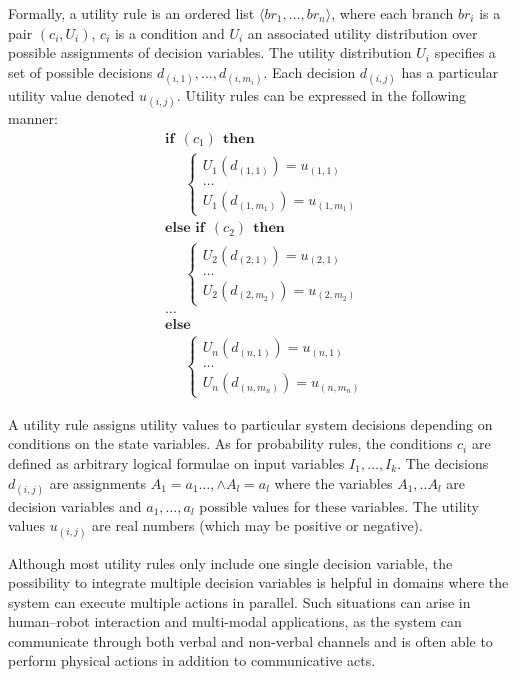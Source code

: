 Formally, a utility rule is an ordered list $\langle br_1, \dots, br_n\rangle$, where each branch $br_i$ is a pair $(c_i, U_i)$, $c_i$ is a condition and $U_i$ an associated utility distribution over possible assignments of decision variables. The utility distribution $U_i$ specifies a set of possible decisions $d_{(i,1)}, \dots, d_{(i,m_i)}$.  Each decision $d_{(i,j)}$ has a particular utility value denoted $u_{(i,j)}$.  Utility rules can be expressed in the following manner:
\begin{equation}
\begin{aligned}
& \textbf{if} \ \ (c_{1}) \ \ \textbf{then} \\ 
& \;\;\;\;\; \begin{cases}
U_1(d_{(1,1)}) = u_{(1,1)} \\
 \dots \\
U_1(d_{(1,m_1)}) = u_{(1,m_1)} 
\end{cases} \\[3mm]
& \textbf{else if} \ \ (c_{2}) \ \ \textbf{then} \\ 
& \;\;\;\;\; \begin{cases}
U_2(d_{(2,1)}) = u_{(2,1)} \\
 \dots \\
U_2(d_{(2,m_2)}) = u_{(2,m_2)} 
\end{cases} \\
& \dots  \\
& \textbf{else} \\
& \;\;\;\;\; \begin{cases}
U_n(d_{(n,1)}) = u_{(n,1)} \\
 \dots \\
U_n(d_{(n,m_n)}) = u_{(n,m_n)}
\end{cases}
\end{aligned}
\end{equation}

A utility rule assigns utility values to particular system decisions depending on conditions on the state variables.  As for probability rules, the conditions $c_i$ are defined as arbitrary logical formulae on input variables $I_1, \dots, I_k$.  The decisions $d_{(i,j)}$ are assignments $A_1\!=\!a_1 \dots, \land A_{l}\!=\!a_{l}$ where the variables $A_1,..A_{l}$ are decision variables and $a_1, \dots, a_{l}$ possible values for these variables. The utility values $u_{(i,j)}$ are real numbers (which may be positive or negative).  

Although most utility rules only include one single decision variable, the possibility to integrate multiple decision variables is helpful in domains where the system can execute multiple actions in parallel. Such situations can arise in human--robot interaction and multi-modal applications, as the system can communicate through both verbal and non-verbal channels and is often able to perform physical actions in addition to communicative acts. 
 
